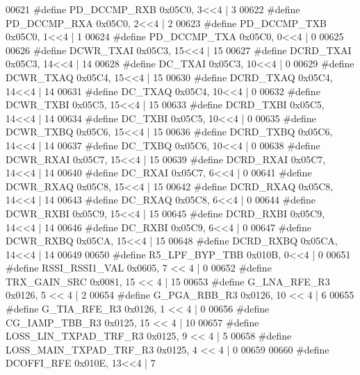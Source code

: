 \begin{DoxyCode}
00621 \textcolor{preprocessor}{#define PD\_DCCMP\_RXB 0x05C0, 3<<4 | 3}
00622 \textcolor{preprocessor}{#define PD\_DCCMP\_RXA 0x05C0, 2<<4 | 2}
00623 \textcolor{preprocessor}{#define PD\_DCCMP\_TXB 0x05C0, 1<<4 | 1}
00624 \textcolor{preprocessor}{#define PD\_DCCMP\_TXA 0x05C0, 0<<4 | 0}
00625 
00626 \textcolor{preprocessor}{#define DCWR\_TXAI 0x05C3, 15<<4 | 15}
00627 \textcolor{preprocessor}{#define DCRD\_TXAI 0x05C3, 14<<4 | 14}
00628 \textcolor{preprocessor}{#define DC\_TXAI 0x05C3, 10<<4 | 0}
00629 \textcolor{preprocessor}{#define DCWR\_TXAQ 0x05C4, 15<<4 | 15}
00630 \textcolor{preprocessor}{#define DCRD\_TXAQ 0x05C4, 14<<4 | 14}
00631 \textcolor{preprocessor}{#define DC\_TXAQ 0x05C4, 10<<4 | 0}
00632 \textcolor{preprocessor}{#define DCWR\_TXBI 0x05C5, 15<<4 | 15}
00633 \textcolor{preprocessor}{#define DCRD\_TXBI 0x05C5, 14<<4 | 14}
00634 \textcolor{preprocessor}{#define DC\_TXBI 0x05C5, 10<<4 | 0}
00635 \textcolor{preprocessor}{#define DCWR\_TXBQ 0x05C6, 15<<4 | 15}
00636 \textcolor{preprocessor}{#define DCRD\_TXBQ 0x05C6, 14<<4 | 14}
00637 \textcolor{preprocessor}{#define DC\_TXBQ 0x05C6, 10<<4 | 0}
00638 \textcolor{preprocessor}{#define DCWR\_RXAI 0x05C7, 15<<4 | 15}
00639 \textcolor{preprocessor}{#define DCRD\_RXAI 0x05C7, 14<<4 | 14}
00640 \textcolor{preprocessor}{#define DC\_RXAI 0x05C7, 6<<4 | 0}
00641 \textcolor{preprocessor}{#define DCWR\_RXAQ 0x05C8, 15<<4 | 15}
00642 \textcolor{preprocessor}{#define DCRD\_RXAQ 0x05C8, 14<<4 | 14}
00643 \textcolor{preprocessor}{#define DC\_RXAQ 0x05C8, 6<<4 | 0}
00644 \textcolor{preprocessor}{#define DCWR\_RXBI 0x05C9, 15<<4 | 15}
00645 \textcolor{preprocessor}{#define DCRD\_RXBI 0x05C9, 14<<4 | 14}
00646 \textcolor{preprocessor}{#define DC\_RXBI 0x05C9, 6<<4 | 0}
00647 \textcolor{preprocessor}{#define DCWR\_RXBQ 0x05CA, 15<<4 | 15}
00648 \textcolor{preprocessor}{#define DCRD\_RXBQ 0x05CA, 14<<4 | 14}
00649 
00650 \textcolor{preprocessor}{#define R5\_LPF\_BYP\_TBB 0x010B, 0<<4 | 0}
00651 \textcolor{preprocessor}{#define RSSI\_RSSI1\_VAL 0x0605, 7 << 4 | 0}
00652 \textcolor{preprocessor}{#define TRX\_GAIN\_SRC 0x0081, 15 << 4 | 15}
00653 \textcolor{preprocessor}{#define G\_LNA\_RFE\_R3 0x0126, 5 << 4 | 2}
00654 \textcolor{preprocessor}{#define G\_PGA\_RBB\_R3 0x0126, 10 << 4 | 6}
00655 \textcolor{preprocessor}{#define G\_TIA\_RFE\_R3 0x0126, 1 << 4 | 0}
00656 \textcolor{preprocessor}{#define CG\_IAMP\_TBB\_R3 0x0125, 15 << 4 | 10}
00657 \textcolor{preprocessor}{#define LOSS\_LIN\_TXPAD\_TRF\_R3 0x0125, 9 << 4 | 5}
00658 \textcolor{preprocessor}{#define LOSS\_MAIN\_TXPAD\_TRF\_R3 0x0125, 4 << 4 | 0}
00659 
00660 \textcolor{preprocessor}{#define DCOFFI\_RFE 0x010E, 13<<4 | 7}

\end{DoxyCode}

